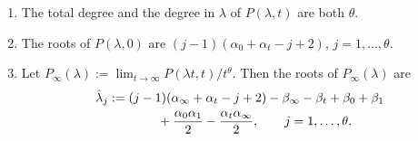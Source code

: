 \begin{Lemma} \label{lemma: P in lambda} \qquad
 \begin{enumerate}\itemsep=0pt
 \item[$({\rm i})$] The total degree and the degree in $\lambda$ of
 $P(\lambda,t)$ are both $\theta$.
 \item[$({\rm ii})$] The roots of $P(\lambda,0)$ are
 $(j-1)(\alpha_0+\alpha_t-j+2)$, $j=1,\dots,\theta$.
 \item[$({\rm iii})$] Let $P_\infty(\lambda):=\lim_{t\to\infty}P(\lambda
 t,t)/t^\theta$. Then the roots of $P_\infty(\lambda)$ are
 \begin{gather}
 \hat\lambda_j:=(j-1)(\alpha_\infty+\alpha_t-j+2)
 -\beta_\infty-\beta_t+\beta_0+\beta_1\nonumber\\
 \hphantom{\hat\lambda_j:=}{} +\frac{\alpha_0\alpha_1}2
 -\frac{\alpha_t\alpha_\infty}2,\qquad j=1,\dots,\theta.\label{eq: roots infinity}
 \end{gather}
 \end{enumerate}
\end{Lemma}


